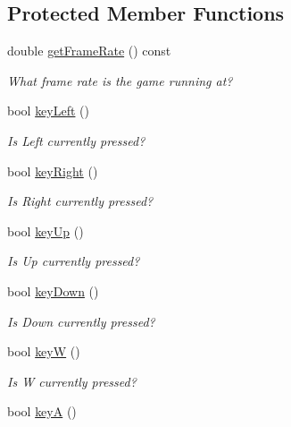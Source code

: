 \subsection*{Protected Member Functions}
\begin{DoxyCompactItemize}
\item 
double \hyperlink{classbridges_1_1game_1_1_non_blocking_game_ab3bee2db9d0d2c4e74ae7943516fb53a}{get\+Frame\+Rate} () const
\begin{DoxyCompactList}\small\item\em What frame rate is the game running at? \end{DoxyCompactList}\item 
bool \hyperlink{classbridges_1_1game_1_1_non_blocking_game_a9b7ba679dd177b28f84ea24b9924a51c}{key\+Left} ()
\begin{DoxyCompactList}\small\item\em Is Left currently pressed? \end{DoxyCompactList}\item 
bool \hyperlink{classbridges_1_1game_1_1_non_blocking_game_afbea1fa2acec16e952be66ce76d496a9}{key\+Right} ()
\begin{DoxyCompactList}\small\item\em Is Right currently pressed? \end{DoxyCompactList}\item 
bool \hyperlink{classbridges_1_1game_1_1_non_blocking_game_a0a93cf74e7eac55c33f76cd55d525084}{key\+Up} ()
\begin{DoxyCompactList}\small\item\em Is Up currently pressed? \end{DoxyCompactList}\item 
bool \hyperlink{classbridges_1_1game_1_1_non_blocking_game_a52dd79aaaee9da77fa392fb8ec37fa94}{key\+Down} ()
\begin{DoxyCompactList}\small\item\em Is Down currently pressed? \end{DoxyCompactList}\item 
bool \hyperlink{classbridges_1_1game_1_1_non_blocking_game_a7bd5c2ab845e24525649dda7f8dfd460}{keyW} ()
\begin{DoxyCompactList}\small\item\em Is W currently pressed? \end{DoxyCompactList}\item 
bool \hyperlink{classbridges_1_1game_1_1_non_blocking_game_af88089437e34df580b247cb27047fd14}{keyA} ()

\end{DoxyCompactItemize}
